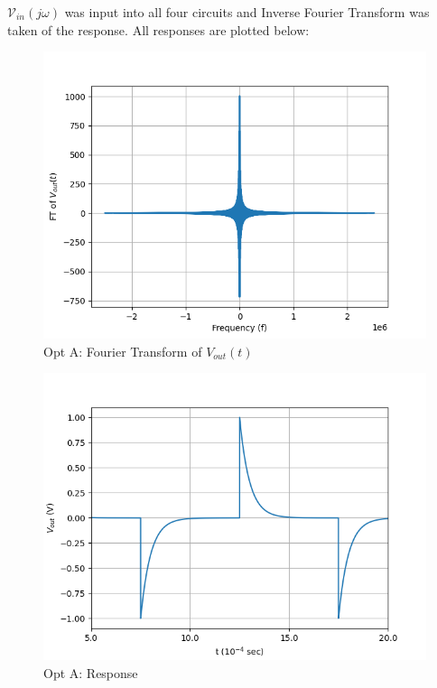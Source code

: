 \documentclass[journal,12pt,twocolumn]{IEEEtran}
\theoremstyle{remark}
\begin{document}
$\mathcal{V}_{in}(j\omega)$ was input into all four circuits and Inverse Fourier Transform was taken of the response. All responses are plotted below:
\begin{figure}[!h]
    \centering
    \includegraphics[width = \columnwidth]{figs/opt_a_ft.png}
    \caption{Opt A: Fourier Transform of $V_{out}(t)$}
    \label{fig:a_ft_gate.ph.23.37}
\end{figure}
\begin{figure}[!h]
    \centering
    \includegraphics[width = \columnwidth]{figs/opt_a_res.png}
    \caption{Opt A: Response}
    \label{fig:a_res_gate.ph.23.37}
\end{figure}
\end{document}
